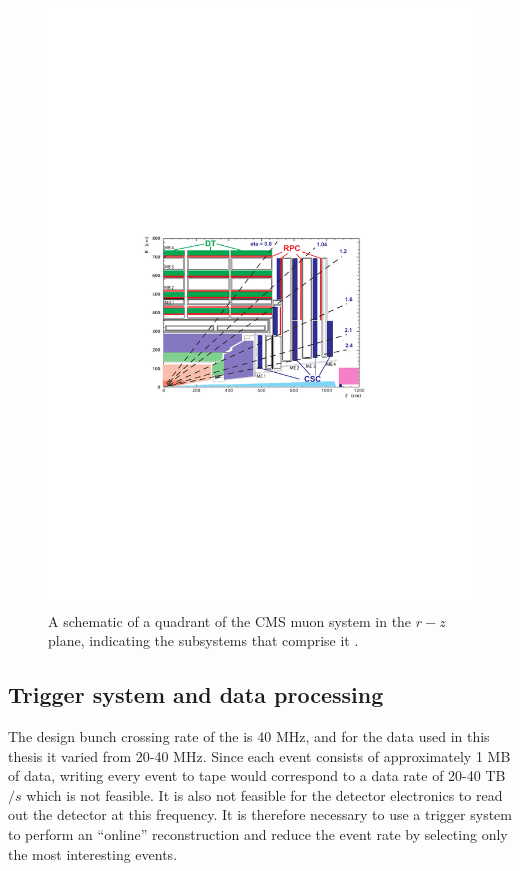 \begin{figure}
  \includegraphics[width=1.2\largefigwidth]{plots/detector/muon_layout.pdf}
  \caption{A schematic of a quadrant of the CMS muon system in the $r-z$ plane, indicating the subsystems that comprise it \cite{Bayatian:922757}.}
  \label{fig:muonschematic}
\end{figure}

\subsection{Trigger system and data processing}
\label{sec:triggers}
The design bunch crossing rate of the \LHC is 40 MHz, and for the data used in this thesis it varied from 20-40 MHz. Since each event consists of approximately 1 MB of data, writing every event to tape would correspond to a data rate of 20-40 TB$/s$ which is not feasible. It is also not feasible for the detector electronics to read out the detector at this frequency. It is therefore necessary to use a trigger system to perform an ``online'' reconstruction and reduce the event rate by selecting only the most interesting events.

